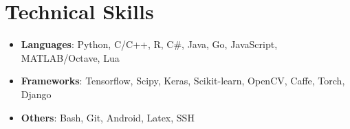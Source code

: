 \documentclass[letterpaper,11pt]{article}
\newcommand{\resumeSubHeadingListStart}{\begin{itemize}[leftmargin=*]}
\newcommand{\resumeSubHeadingListEnd}{\end{itemize}}
\begin{document}
%
\section{Technical Skills}
  \resumeSubHeadingListStart
    \item{
      \textbf{Languages}{: Python, C/C++, R, C\#, Java, Go, JavaScript, MATLAB/Octave, Lua}}
      \\
      \item{
     \textbf{Frameworks}{: Tensorflow, Scipy, Keras, Scikit-learn, OpenCV, Caffe, Torch, Django}}
     \\
     \item{
     \textbf{Others}{: Bash, Git, Android, Latex, SSH}}
    
  \resumeSubHeadingListEnd


\end{document}

